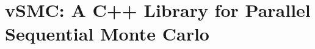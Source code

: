 \chapter{vSMC: A C++ Library for Parallel Sequential Monte Carlo}
\label{cha:vSMC: A C++ Library for Parallel Sequential Monte Carlo}



